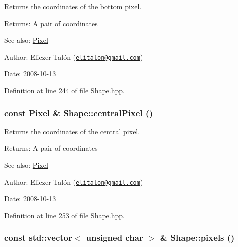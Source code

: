 Returns the coordinates of the bottom pixel. 

\begin{Desc}
\item[Returns:]A pair of coordinates\end{Desc}
\begin{Desc}
\item[See also:]\hyperlink{_pixel_8hpp_535e59456e3e633842529cfa8ea103c4}{Pixel}\end{Desc}
\begin{Desc}
\item[Author:]Eliezer Talón (\href{mailto:elitalon@gmail.com}{\tt elitalon@gmail.com}) \end{Desc}
\begin{Desc}
\item[Date:]2008-10-13 \end{Desc}


Definition at line 244 of file Shape.hpp.\hypertarget{class_shape_cae0adae98c38009c8241ef0baa169c3}{
\subsubsection[centralPixel]{\setlength{\rightskip}{0pt plus 5cm}const {\bf Pixel} \& Shape::centralPixel ()}}
\label{class_shape_cae0adae98c38009c8241ef0baa169c3}


Returns the coordinates of the central pixel. 

\begin{Desc}
\item[Returns:]A pair of coordinates\end{Desc}
\begin{Desc}
\item[See also:]\hyperlink{_pixel_8hpp_535e59456e3e633842529cfa8ea103c4}{Pixel}\end{Desc}
\begin{Desc}
\item[Author:]Eliezer Talón (\href{mailto:elitalon@gmail.com}{\tt elitalon@gmail.com}) \end{Desc}
\begin{Desc}
\item[Date:]2008-10-13 \end{Desc}


Definition at line 253 of file Shape.hpp.\hypertarget{class_shape_7623c856a1a7916fc000f43d5efdba5b}{
\subsubsection[pixels]{\setlength{\rightskip}{0pt plus 5cm}const std::vector$<$ unsigned char $>$ \& Shape::pixels ()}}
\label{class_shape_7623c856a1a7916fc000f43d5efdba5b}



